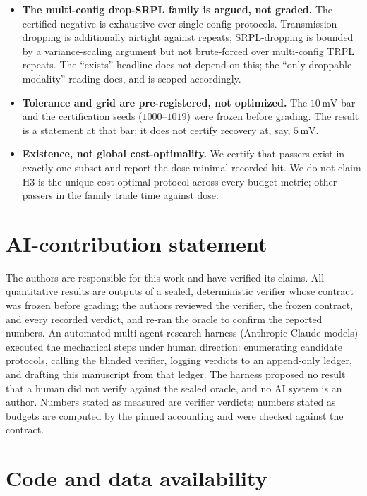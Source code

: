 \documentclass[11pt]{article}
\newcommand{\mV}{\,\mathrm{mV}}
\begin{document}
\begin{itemize}
\item \textbf{The multi-config drop-SRPL family is argued, not graded.} The certified negative is exhaustive over single-config protocols. Transmission-dropping is additionally airtight against repeats; SRPL-dropping is bounded by a variance-scaling argument but not brute-forced over multi-config TRPL repeats. The ``exists'' headline does not depend on this; the ``only droppable modality'' reading does, and is scoped accordingly.
\item \textbf{Tolerance and grid are pre-registered, not optimized.} The $10\mV$ bar and the certification seeds ($1000$--$1019$) were frozen before grading. The result is a statement at that bar; it does not certify recovery at, say, $5\mV$.
\item \textbf{Existence, not global cost-optimality.} We certify that passers exist in exactly one subset and report the dose-minimal recorded hit. We do not claim H3 is the unique cost-optimal protocol across every budget metric; other passers in the family trade time against dose.
\end{itemize}

\section{AI-contribution statement}

The authors are responsible for this work and have verified its claims. All quantitative results are outputs of a sealed, deterministic verifier whose contract was frozen before grading; the authors reviewed the verifier, the frozen contract, and every recorded verdict, and re-ran the oracle to confirm the reported numbers. An automated multi-agent research harness (Anthropic Claude models) executed the mechanical steps under human direction: enumerating candidate protocols, calling the blinded verifier, logging verdicts to an append-only ledger, and drafting this manuscript from that ledger. The harness proposed no result that a human did not verify against the sealed oracle, and no AI system is an author. Numbers stated as measured are verifier verdicts; numbers stated as budgets are computed by the pinned accounting and were checked against the contract.

\section{Code and data availability}
\end{document}
